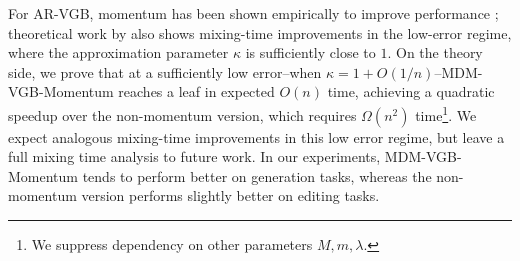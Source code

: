 \documentclass{article}
\numberwithin{theorem}{section}
\numberwithin{proposition}{section}
\numberwithin{corollary}{section}
\numberwithin{lemma}{section}
\numberwithin{conjecture}{section}
\numberwithin{remark}{section}
\numberwithin{definition}{section}
\numberwithin{assumption}{section}
\numberwithin{example}{section}
\begin{document}
For AR-VGB, momentum has been shown
empirically to improve performance \citep{rohatgi2025taming}; theoretical work by  \citep{hayes2010liftings}
 also shows mixing-time improvements in the low-error regime, where the approximation parameter
\(\kappa\) is sufficiently close to \(1\). On the theory side, we prove that at a sufficiently low error--when $\kappa= 1+ O(1/n)$--MDM-VGB-Momentum reaches a leaf in expected $O(n)$ time, achieving a quadratic speedup over the non-momentum version, which requires $\Omega(n^2)$ time\footnote{We suppress dependency on other parameters $M,m,\lambda.$}.  We expect analogous mixing-time improvements in this low error regime, but leave a full mixing time analysis to future work. In our experiments, MDM-VGB-Momentum tends to perform better on generation tasks,
whereas the non-momentum version performs slightly better on editing tasks.
\end{document}
